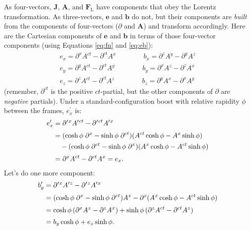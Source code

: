 \documentclass[12pt]{article}
\renewcommand{\vv}[1]{\mathbf{#1}}
\begin{document}
As four-vectors, $\vv J$, $\vv A$, and $\vv F_{\mathrm{L}}$ have components that obey the Lorentz transformation. As three-vectors, $\vv e$ and $\vv b$ do not, but their components are \emph{built} from the components of four-vectors ($\partialup$ and $\vv A$) and transform accordingly. Here are the Cartesian components of $\vv e$ and $\vv b$ in terms of those four-vector components (using Equations \ref{eq:fn} and \ref{eq:eb}):
\begin{equation*}
\begin{aligned}
e_x = \partial^x A^{ct} - \partial^{ct} A^x \qquad \qquad b_x = \partial^z A^y - \partial^y A^z \\
e_y = \partial^y A^{ct} - \partial^{ct} A^y \qquad \qquad b_y = \partial^x A^z - \partial^z A^x \\
e_z = \partial^z A^{ct} - \partial^{ct} A^z \qquad \qquad b_z = \partial^y A^x - \partial^x A^y 
\end{aligned}
\end{equation*}
(remember, $\partial^{ct}$ is the positive $ct$-partial, but the other components of $\partialup$ are \emph{negative} partials). Under a standard-configuration boost with relative rapidity $\phi$ between the frames, $e^\prime_x$ is:
\begin{equation*}
\begin{split}
e^\prime_x &= \partial^{\mkern.5mu \prime \mkern1mu x} A^{\prime \mkern1mu ct} - \partial^{\mkern.5mu \prime \mkern1mu ct} A^{\prime \mkern1mu x} \\[2pt]
&= (\cosh{\phi} \; \partial^x  - \sinh{\phi} \; \partial^{ct} )(A^{ct} \cosh{\phi}  - A^x \sinh{\phi} ) \\
& \quad - (\cosh{\phi} \; \partial^{ct} -  \sinh{\phi} \; \partial^x )(A^x \cosh{\phi} - A^{ct} \sinh{\phi} ) \\[2pt]
&= \partial^x A^{ct} - \partial^{ct} A^x = e_x .
\end{split}
\end{equation*}
Let's do one more component:
\begin{equation*}
\begin{split}
b^\prime_y &= \partial^{\mkern.5mu \prime \mkern1mu x} A^{\prime \mkern1mu z} - \partial^{\mkern.5mu \prime \mkern1mu z} A^{\prime \mkern1mu x} \\[2pt]
&= (\cosh{\phi} \; \partial^x  - \sinh{\phi} \; \partial^{ct} ) A^z - \partial^z (A^x \cosh{\phi} - A^{ct} \sinh{\phi} ) \\[2pt]
&= \cosh{\phi} \, (\partial^x A^z - \partial^z A^x) + \sinh{\phi} \, (\partial^z A^{ct} - \partial^{ct} A^z) \\[2pt]
&= b_y \cosh{\phi} + e_z \sinh{\phi} .
\end{split}
\end{equation*}
\end{document}
